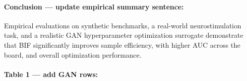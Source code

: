 
\paragraph{Conclusion --- update empirical summary sentence:}

Empirical evaluations on synthetic benchmarks, a real-world
neurostimulation task, and a realistic GAN hyperparameter optimization surrogate
demonstrate that BIF significantly improves sample efficiency,
with higher AUC across the board, and overall optimization performance.



\paragraph{Table 1 --- add GAN rows:}



